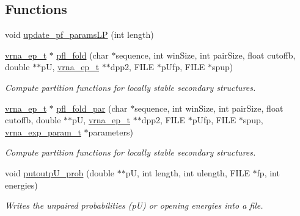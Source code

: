 \subsection*{Functions}
\begin{DoxyCompactItemize}
\item 
void \mbox{\hyperlink{group__part__func__window__deprecated_ga5a019014d37fe6105131dfc2fc447880}{update\+\_\+pf\+\_\+params\+LP}} (int length)
\item 
\mbox{\hyperlink{group__struct__utils__plist_gab9ac98ab55ded9fb90043b024b915aca}{vrna\+\_\+ep\+\_\+t}} $\ast$ \mbox{\hyperlink{group__part__func__window__deprecated_ga7cdf690583871f9c158a0f91d4785cb6}{pfl\+\_\+fold}} (char $\ast$sequence, int win\+Size, int pair\+Size, float cutoffb, double $\ast$$\ast$pU, \mbox{\hyperlink{group__struct__utils__plist_gab9ac98ab55ded9fb90043b024b915aca}{vrna\+\_\+ep\+\_\+t}} $\ast$$\ast$dpp2, F\+I\+LE $\ast$p\+Ufp, F\+I\+LE $\ast$spup)
\begin{DoxyCompactList}\small\item\em Compute partition functions for locally stable secondary structures. \end{DoxyCompactList}\item 
\mbox{\label{group__part__func__window__deprecated_gaedf355f07b3d83bc93f98712132571b0}} 
\mbox{\hyperlink{group__struct__utils__plist_gab9ac98ab55ded9fb90043b024b915aca}{vrna\+\_\+ep\+\_\+t}} $\ast$ \mbox{\hyperlink{group__part__func__window__deprecated_gaedf355f07b3d83bc93f98712132571b0}{pfl\+\_\+fold\+\_\+par}} (char $\ast$sequence, int win\+Size, int pair\+Size, float cutoffb, double $\ast$$\ast$pU, \mbox{\hyperlink{group__struct__utils__plist_gab9ac98ab55ded9fb90043b024b915aca}{vrna\+\_\+ep\+\_\+t}} $\ast$$\ast$dpp2, F\+I\+LE $\ast$p\+Ufp, F\+I\+LE $\ast$spup, \mbox{\hyperlink{group__energy__parameters_ga01d8b92fe734df8d79a6169482c7d8d8}{vrna\+\_\+exp\+\_\+param\+\_\+t}} $\ast$parameters)
\begin{DoxyCompactList}\small\item\em Compute partition functions for locally stable secondary structures. \end{DoxyCompactList}\item 
void \mbox{\hyperlink{group__part__func__window__deprecated_ga0bcb751860bbf34e3dfee8c2fbdb3ef3}{putoutp\+U\+\_\+prob}} (double $\ast$$\ast$pU, int length, int ulength, F\+I\+LE $\ast$fp, int energies)
\begin{DoxyCompactList}\small\item\em Writes the unpaired probabilities (pU) or opening energies into a file. \end{DoxyCompactList}\item 
$$
\end{DoxyCompactItemize}

